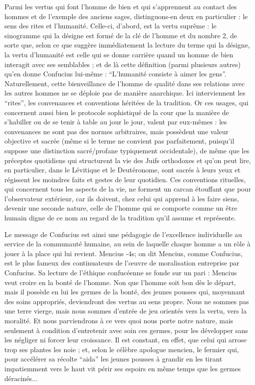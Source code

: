 Parmi les vertus qui font l'homme de bien et qui s'apprennent au contact des hommes et
de l'exemple des anciens sages, distinguons-en deux en particulier : le sens des rites et
l'humanité.
Celle-ci, d'abord, est la vertu suprême : le sinogramme qui la désigne
est formé de la clé de l'homme et du nombre 2, de sorte que,
selon ce que suggère immédiatement la lecture du terme qui la désigne, la vertu
d'humanité est celle qui se donne carrière quand un homme de bien interagit avec ses
semblables ; et de là cette définition (parmi plusieurs autres) qu'en donne Confucius lui-même :
``L'humanité consiste à aimer les gens''.
Naturellement, cette bienveillance
de l'homme de qualité dans ses relations avec les autres hommes ne se déploie
pas de manière anarchique.
Ici interviennent les ``rites'', les convenances et conventions
héritées de la tradition.
Or ces usages, qui concernent aussi bien le protocole
sophistiqué de la cour que la manière de s'habiller ou de se tenir à table au jour le jour,
valent par eux-mêmes : les convenances ne sont pas des normes arbitraires, mais possèdent
une valeur objective et sacrée (même si le terme ne convient pas parfaitement,
puisqu'il suppose une distinction sacré/profane typiquement occidentale), de même que
les préceptes quotidiens qui structurent la vie des Juifs orthodoxes et qu'on peut lire, en
particulier, dans le Lévitique et le Deutéronome, sont sacrés à leurs yeux et régissent les
moindres faits et gestes de leur quotidien.
Ces conventions rituelles, qui concernent tous
les aspects de la vie, ne forment un carcan étouffant que pour l'observateur extérieur, car
ils doivent, chez celui qui apprend à les faire siens, devenir une seconde nature, celle de
l'homme qui se comporte comme un être humain digne de ce nom au regard de la tradition qu'il assume et représente.

Le message de Confucius est ainsi une pédagogie de l'excellence individuelle au service
de la communauté humaine, au sein de laquelle chaque homme a un rôle à jouer à la place
qui lui revient.
Mencius -4s; on dit Mencius, comme Confucius,
est le plus fameux des continuateurs de l'œuvre de moralisation entreprise par
Confucius.
Sa lecture de l'éthique confucéenne se fonde sur un pari :
Mencius veut croire en la bonté de l'homme.
Non que l'homme soit bon dès le départ, mais il possède en lui
les germes de la bonté, des jeunes pousses qui, moyennant des
soins appropriés, deviendront des vertus au sens propre.
Nous ne sommes pas une terre
vierge, mais nous sommes d'entrée de jeu orientés vers la vertu, vers la moralité.
Et nous
parviendrons à ce vers quoi nous porte notre nature, mais seulement à condition
d'entretenir avec soin ces germes, pour les développer sans les négliger ni forcer leur
croissance.
Il est constant, en effet, que celui qui arrose trop ses plantes les noie ; et, selon
le célèbre apologue mencien, le fermier qui, pour accélérer sa récolte ``aida'' les jeunes
pousses à grandir en les tirant impatiemment vers le haut vit périr ses espoirs en même
temps que les germes déracinés...

